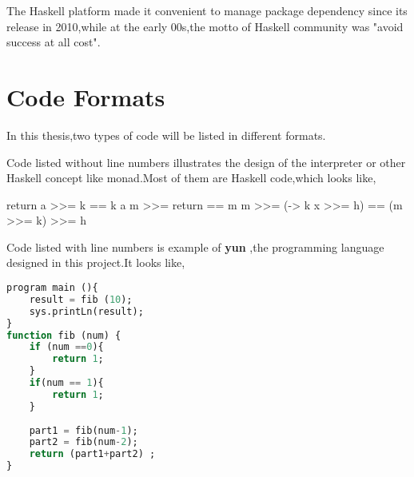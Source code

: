 The Haskell platform made it convenient to manage package dependency since its release in 2010,while at the early 00s,the motto of Haskell community was "avoid success at all cost"\cite{jones_wearing_2003}.


\section{Code Formats}
In this thesis,two types of code will be listed in different formats.

Code listed without line numbers illustrates the design of the interpreter or other Haskell concept like monad.Most of them are Haskell code,which looks like,
\begin{hcode}
 return a >>= k  ==  k a
 m >>= return  ==  m
 m >>= (\x -> k x >>= h)  ==  (m >>= k) >>= h
\end{hcode}


Code listed with line numbers is example of \textbf{yun} ,the programming language designed in this project.It looks like,
\begin{lstlisting}[language=SQL]
program main (){
	result = fib (10);
	sys.printLn(result);	
} 
function fib (num) {
	if (num ==0){
		return 1;
	}
	if(num == 1){
		return 1;
	}
	
	part1 = fib(num-1);
	part2 = fib(num-2);
	return (part1+part2) ;
}
\end{lstlisting}